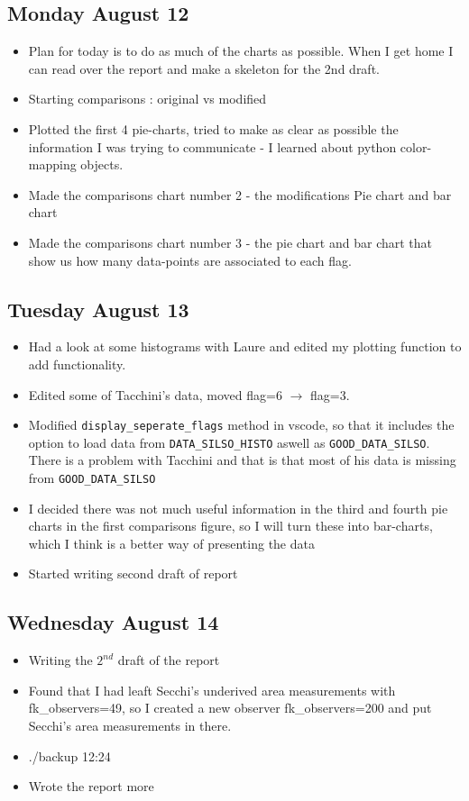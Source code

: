 \documentclass[12pt]{article}
\begin{document}
\subsection{Monday August 12}
\begin{itemize}
    \item Plan for today is to do as much of the charts as possible. When I get home I can read over the report and make a skeleton for the 2nd draft.
    \item Starting comparisons : original vs modified
    \item Plotted the first 4 pie-charts, tried to make as clear as possible the information I was trying to communicate - I learned about python color-mapping objects.
    \item Made the comparisons chart number 2 - the modifications Pie chart and bar chart
    \item Made the comparisons chart number 3 - the pie chart and bar chart that show us how many data-points are associated to each flag.
\end{itemize}

\subsection{Tuesday August 13}
\begin{itemize}
    \item Had a look at some histograms with Laure and edited my plotting function to add functionality.
    \item Edited some of Tacchini's data, moved flag=6 $\to$ flag=3. 
    \item Modified \texttt{display\_seperate\_flags} method in vscode, so that it includes the option to load data from \texttt{DATA\_SILSO\_HISTO} aswell as \texttt{GOOD\_DATA\_SILSO}. There is a problem with Tacchini and that is that most of his data is missing from \texttt{GOOD\_DATA\_SILSO}
    \item I decided there was not much useful information in the third and fourth pie charts in the first comparisons figure, so I will turn these into bar-charts, which I think is a better way of presenting the data
    \item Started writing second draft of report
\end{itemize}

\subsection{Wednesday August 14}
\begin{itemize}
    \item Writing the $2^{nd}$ draft of the report
    \item Found that I had leaft Secchi's underived area measurements with fk\_observers=49, so I created a new observer fk\_observers=200 and put Secchi's area measurements in there.
    \item ./backup 12:24
    \item Wrote the report more
\end{itemize}
\end{document}
